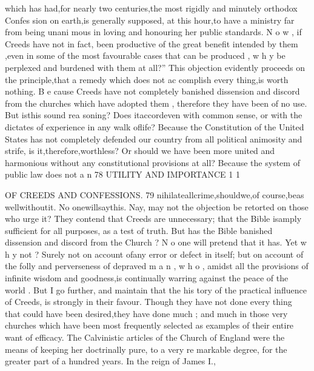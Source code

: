 \documentclass[
]{book}
\begin{document}
which has had,for nearly two centuries,the
most rigidly and minutely orthodox Confes
sion on earth,is generally supposed, at this
hour,to have a ministry far from being unani
mous in loving and honouring her public
standards. N o w , if Creeds have not in fact,
been productive of the great benefit intended
by them ,even in some of the most favourable
cases that can be produced , w h y be perplexed and burdened with them at all?''
This objection evidently proceeds on the principle,that a remedy which does not ac complish every thing,is worth nothing. B e
cause Creeds have not completely banished dissension and discord from the churches
which have adopted them , therefore they have been of no use. But isthis sound rea soning? Does itaccordeven with common
sense, or with the dictates of experience in any walk oflife? Because the Constitution of the United States has not completely defended our country from all political animosity and strife, is it,therefore,worthless? Or should we have been more united and harmonious without any constitutional provisions at all? Because the system of public law does not a n
78
UTILITY AND IMPORTANCE
1
1

OF CREEDS AND CONFESSIONS. 79
nihilateallcrime,shouldwe,of course,beas wellwithoutit. No onewillsaythis. Nay, may not the objection be retorted on those who urge it? They contend that Creeds are unnecessary; that the Bible isamply sufficient
for all purposes, as a test of truth. But has the Bible banished dissension and discord from the Church ? N o one will pretend that it has. Yet w h y not ? Surely not on account ofany error or defect in itself; but on account of the folly and perverseness of depraved m a n , w h o , amidst all the provisions of infinite wisdom and goodness,is continually warring against the peace of the world .
But I go further, and maintain that the his tory of the practical influence of Creeds, is strongly in their favour. Though they have
not done every thing that could have been
desired,they have done much ; and much in
those very churches which have been most
frequently selected as examples of their entire want of efficacy. The Calvinistic articles of
the Church of England were the means of keeping her doctrinally pure, to a very re markable degree, for the greater part of a
hundred years. In the reign of James I.,
\end{document}
